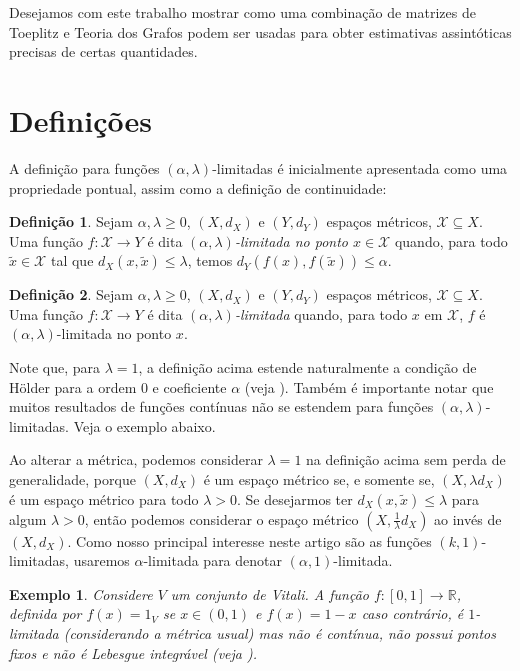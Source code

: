 \documentclass[a4paper,12pt]{article}
\newtheorem{example}{Exemplo}
\theoremstyle{definition}
\newtheorem{definition}{Definição}
\begin{document}
Desejamos com este trabalho mostrar como uma combinação de matrizes de Toeplitz e Teoria dos Grafos podem ser usadas para obter estimativas assintóticas precisas de certas quantidades.

\newpage
\section{Definições}
\vspace{1cm}
A definição para funções $(\alpha,\lambda)$-limitadas é inicialmente apresentada como uma propriedade pontual, assim como a definição de continuidade: \begin{definition} Sejam $\alpha, \lambda \ge 0$, $(X, d_X)$ e $(Y, d_Y)$ espaços métricos, $\mathcal{X} \subseteq X$. Uma função $f : \mathcal{X} \to Y$ é dita \textit{$(\alpha,\lambda)$-limitada no ponto $x \in \mathcal{X}$} quando, para todo $\tilde{x} \in \mathcal{X}$ tal que $d_X(x, \tilde{x}) \le \lambda$, temos $d_Y(f(x), f(\tilde{x})) \le \alpha$. \end{definition}

\begin{definition} Sejam $\alpha, \lambda \ge 0$, $(X, d_X)$ e $(Y, d_Y)$ espaços métricos, $\mathcal{X} \subseteq X$. Uma função $f : \mathcal{X} \to Y$ é dita \textit{$(\alpha,\lambda)$-limitada} quando, para todo $x$ em $\mathcal{X}$, $f$ é $(\alpha,\lambda)$-limitada no ponto $x$. \end{definition}

Note que, para $\lambda = 1$, a definição acima estende naturalmente a condição de Hölder para a ordem $0$ e coeficiente $\alpha$ (veja \cite{holder}). Também é importante notar que muitos resultados de funções contínuas não se estendem para funções $(\alpha, \lambda)$-limitadas. Veja o exemplo abaixo.

Ao alterar a métrica, podemos considerar $\lambda = 1$ na definição acima sem perda de generalidade, porque $(X, d_X)$ é um espaço métrico se, e somente se, $(X, \lambda d_X)$ é um espaço métrico para todo $\lambda > 0$. Se desejarmos ter $d_X(x, \tilde{x}) \le \lambda$ para algum $\lambda > 0$, então podemos considerar o espaço métrico $(X, \frac{1}{\lambda} d_X)$ ao invés de $(X, d_X)$. Como nosso principal interesse neste artigo são as funções $(k,1)$-limitadas, usaremos $\alpha$-limitada para denotar $(\alpha,1)$-limitada.

\begin{example} Considere $V$ um conjunto de Vitali. A função $f : [0, 1] \to \mathbb{R}$, definida por $f(x) = 1_V$ se $x \in (0, 1)$ e $f(x) = 1 - x$ caso contrário, é $1$-limitada (considerando a métrica usual) mas não é contínua, não possui pontos fixos e não é Lebesgue integrável (veja \cite{vitali}). \end{example}
\end{document}
